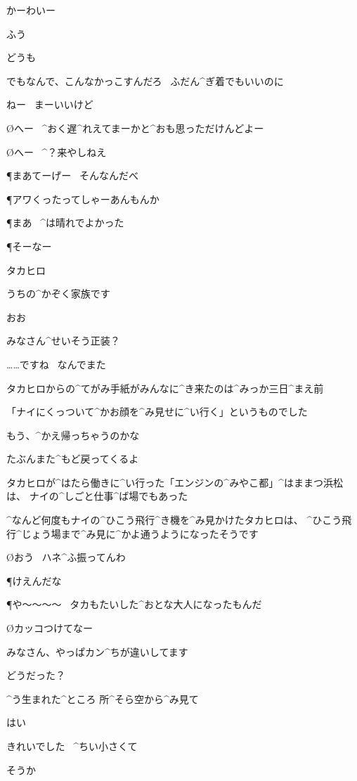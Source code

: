 \A かーわいー

\M ふう

\M どうも

\M でもなんで、こんなかっこすんだろ
\ ふだん^{ぎ}{着}でもいいのに

\A ねー
\ まーいいけど

\page
\O へー
\ ^{おく}{遅}^{れ}{え}てまーかと^{おも}{思}っただけんどよー

\O へー
\ ^{？}{来}やしねえ

\P まあてーげー
\ そんなんだべ

\P  アワくったってしゃーあんもんか

\P まあ
\ ^{は}{晴}れでよかった

\P そーなー

\page[53]
\M タカヒロ

\T うちの^{かぞく}{家族}です

\NA おお

\NA みなさん^{せいそう}{正装}？

\T ……ですね
\ なんでまた

\page
\A タカヒロからの^{てがみ}{手紙}がみんなに^{き}{来}たのは^{みっか}{三日}^{まえ}{前}

\A 「ナイにくっついて^{かお}{顔}を^{み}{見}せに^{い}{行}く」というものでした

\M もう、^{かえ}{帰}っちゃうのかな

\A たぶんまた^{もど}{戻}ってくるよ

\A タカヒロが^{はたら}{働}きに^{い}{行}った「エンジンの^{みやこ}{都}」^{はままつ}{浜松}は、
ナイの^{しごと}{仕事}^{ば}{場}でもあった

\A ^{なんど}{何度}もナイの^{ひこう}{飛行}^{き}{機}を^{み}{見}かけたタカヒロは、
^{ひこう}{飛行}^{じょう}{場}まで^{み}{見}に^{かよ}{通}うようになったそうです

\page[56]
\O おう
\ ハネ^{ふ}{振}ってんわ

\P けえんだな

\page
\P や〜〜〜〜
\ タカもたいした^{おとな}{大人}になったもんだ

\O カッコつけてなー

\A みなさん、やっぱカン^{ちが}{違}いしてます

\page
\NA どうだった？

\NA ^{う}{生}まれた^{ところ }{所}^{そら}{空}から^{み}{見}て

\T はい

\T きれいでした
\ ^{ちい}{小}さくて

\NA そうか

